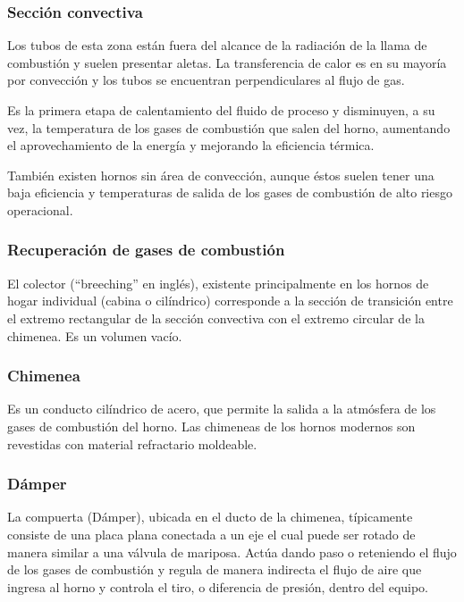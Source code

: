 \subsubsection{Sección convectiva}
\par Los tubos de esta zona están fuera del alcance de la radiación de la llama de combustión y suelen presentar aletas. La transferencia de calor es en su mayoría por convección y los tubos se encuentran perpendiculares al flujo de gas.
\par Es la primera etapa de calentamiento del fluido de proceso y disminuyen, a su vez, la temperatura de los gases de combustión que salen del horno, aumentando el aprovechamiento de la energía y mejorando la eficiencia térmica.
\par También existen hornos sin área de convección, aunque éstos suelen tener una baja eficiencia y temperaturas de salida de los gases de combustión de alto riesgo operacional.

\subsubsection{Recuperación de gases de combustión}
El colector (“breeching” en inglés), existente principalmente en los hornos de hogar individual (cabina o cilíndrico) corresponde a la sección de transición entre el extremo rectangular de la sección convectiva con el extremo circular de la chimenea. Es un volumen vacío.

\subsubsection{Chimenea}
\par Es un conducto cilíndrico de acero, que permite la salida a la atmósfera de los gases de combustión del horno. Las chimeneas de los hornos modernos son revestidas con material refractario moldeable.

\subsubsection{Dámper}
\par La compuerta (Dámper), ubicada en el ducto de la chimenea, típicamente consiste de una placa plana conectada a un eje el cual puede ser rotado de manera similar a una válvula de mariposa. Actúa dando paso o reteniendo el flujo de los gases de combustión y regula de manera indirecta el flujo de aire que ingresa al horno y controla el tiro, o diferencia de presión, dentro del equipo.

